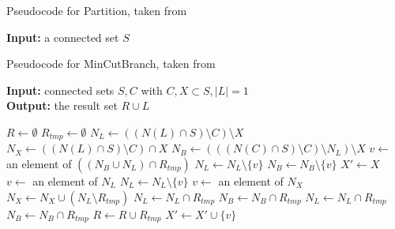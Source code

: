\documentclass[10pt,journal,compsoc]{IEEEtran}
\begin{document}
\begin{algorithm}
\caption{Pseudocode for Partition, taken from \cite{FenderMCB}}
\textbf{Input:} a connected set $S$
\begin{algorithmic}[1]
\EndProcedure
\end{algorithmic}
\end{algorithm}

\begin{algorithm}
\caption{Pseudocode for MinCutBranch, taken from \cite{FenderMCB}}
\textbf{Input:} connected sets $S, C$ with $C, X \subset S, |L| = 1$ \\
\textbf{Output:} the result set $R \cup L$
\begin{algorithmic}[1]
\State $R \leftarrow \emptyset$
\State $R_{tmp} \leftarrow \emptyset$
\State $N_L \leftarrow ((N(L) \cap S) \setminus C) \setminus X$
\State $N_X \leftarrow ((N(L) \cap S) \setminus C) \cap X$
\State $N_B \leftarrow (((N(C) \cap S) \setminus C) \setminus N_L) \setminus X$
 
	\State $v \leftarrow$ an element of $((N_B \cup N_L) \cap R_{tmp})$
	\State $N_L \leftarrow N_L \setminus \{v\}$
	\State $N_B \leftarrow N_B \setminus \{v\}$
\Else
	\State $X' \leftarrow X$
	  
		\State $v \leftarrow$ an element of $N_L$
		\State $N_L \leftarrow N_L \setminus \{v\}$
	\Else  {}
		\State $v \leftarrow$ an element of $N_X$
	\EndIf
		\State $N_X \leftarrow N_X \cup (N_L \setminus R_{tmp})$
		\State $N_L \leftarrow N_L \cap R_{tmp}$
		\State $N_B \leftarrow N_B \cap R_{tmp}$
	\EndIf
		\State $N_L \leftarrow N_L \cap R_{tmp}$
		\State $N_B \leftarrow N_B \cap R_{tmp}$
	\Else
	\EndIf
	\State $R \leftarrow R \cup R_{tmp}$
\EndIf
\State $X' \leftarrow X' \cup \{v\}$
\EndWhile
{}
\EndProcedure
\end{algorithmic}
\end{algorithm}
\end{document}
